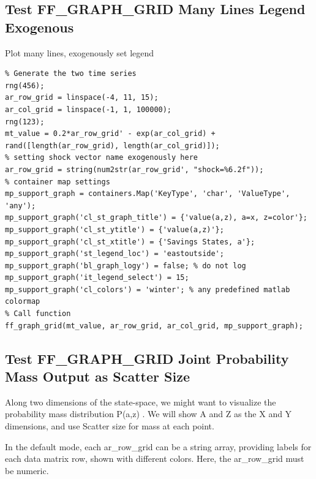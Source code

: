 \documentclass[
]{book}
\begin{document}
\hypertarget{test-ff_graph_grid-many-lines-legend-exogenous}{%
\subsection{Test FF\_GRAPH\_GRID Many Lines Legend Exogenous}\label{test-ff_graph_grid-many-lines-legend-exogenous}}

Plot many lines, exogenously set legend

\begin{verbatim}
% Generate the two time series
rng(456);
ar_row_grid = linspace(-4, 11, 15);
ar_col_grid = linspace(-1, 1, 100000);
rng(123);
mt_value = 0.2*ar_row_grid' - exp(ar_col_grid) + rand([length(ar_row_grid), length(ar_col_grid)]);
% setting shock vector name exogenously here
ar_row_grid = string(num2str(ar_row_grid', "shock=%6.2f"));
% container map settings
mp_support_graph = containers.Map('KeyType', 'char', 'ValueType', 'any');
mp_support_graph('cl_st_graph_title') = {'value(a,z), a=x, z=color'};
mp_support_graph('cl_st_ytitle') = {'value(a,z)'};
mp_support_graph('cl_st_xtitle') = {'Savings States, a'};
mp_support_graph('st_legend_loc') = 'eastoutside';
mp_support_graph('bl_graph_logy') = false; % do not log
mp_support_graph('it_legend_select') = 15;
mp_support_graph('cl_colors') = 'winter'; % any predefined matlab colormap
% Call function
ff_graph_grid(mt_value, ar_row_grid, ar_col_grid, mp_support_graph);
\end{verbatim}

\hypertarget{test-ff_graph_grid-joint-probability-mass-output-as-scatter-size}{%
\subsection{Test FF\_GRAPH\_GRID Joint Probability Mass Output as Scatter Size}\label{test-ff_graph_grid-joint-probability-mass-output-as-scatter-size}}

Along two dimensions of the state-space, we might want to visualize the
probability mass distribution P(a,z) . We will show A and Z as the X and
Y dimensions, and use Scatter size for mass at each point.

In the default mode, each ar\_row\_grid can be a string array, providing
labels for each data matrix row, shown with different colors. Here, the
ar\_row\_grid must be numeric.
\end{document}
